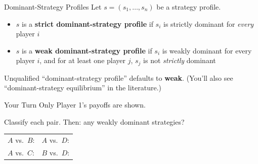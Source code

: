 \begin{frame}{Dominant-Strategy Profiles}
Let $s=(s_1,\ldots,s_n)$ be a strategy profile.
\bsk
\begin{itemize}
    \item $s$ is a \textbf{strict dominant-strategy profile} if $s_i$ is strictly dominant
      for \textit{every} player $i$
    \bsk
    \item $s$ is a \textbf{weak dominant-strategy profile} if $s_i$ is weakly dominant for
      every player $i$, and for at least one player $j$, $s_j$ is not \textit{strictly} dominant
\end{itemize}
\vfill
Unqualified ``dominant-strategy profile'' defaults to \textbf{weak}.
\bsk
{\footnotesize (You'll also see ``dominant-strategy equilibrium'' in the literature.)}
\vspace{-0.4in}
\end{frame}

\begin{frame}{Your Turn}
Only Player 1's payoffs are shown.
\bsk
\centering
\begin{matrixgame}[top={E, F, G}, left={A, B, C, D}, player names={Player 1, Player 2}]
\end{matrixgame}

\raggedright
Classify each pair. Then: any weakly dominant strategies?
\bsk
\begin{tabular}{ll}
$A$ vs.\ $B$: \hspace{1.4in} & $A$ vs.\ $D$: \\[0.3in]
$A$ vs.\ $C$: & $B$ vs.\ $D$: \\[0.3in]
\end{tabular}
\end{frame}


